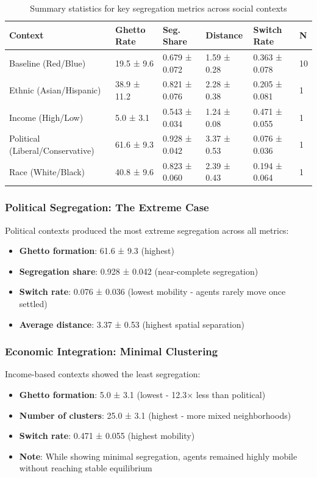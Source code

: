 \documentclass[pdflatex,sn-basic]{sn-jnl}%
\begin{document}
\begin{table}[h]
\caption{Summary statistics for key segregation metrics across social contexts}
\centering
\begin{tabular}{llllll}
\hline
Context & Ghetto Rate & Seg. Share & Distance & Switch Rate & N\\
\hline
Baseline (Red/Blue) & 19.5 ± 9.6 & 0.679 ± 0.072 & 1.59 ± 0.28 & 0.363 ± 0.078 & 10\\
Ethnic (Asian/Hispanic) & 38.9 ± 11.2 & 0.821 ± 0.076 & 2.28 ± 0.38 & 0.205 ± 0.081 & 1\\
Income (High/Low) & 5.0 ± 3.1 & 0.543 ± 0.034 & 1.24 ± 0.08 & 0.471 ± 0.055 & 1\\
Political (Liberal/Conservative) & 61.6 ± 9.3 & 0.928 ± 0.042 & 3.37 ± 0.53 & 0.076 ± 0.036 & 1\\
Race (White/Black) & 40.8 ± 9.6 & 0.823 ± 0.060 & 2.39 ± 0.43 & 0.194 ± 0.064 & 1\\
\hline
\end{tabular}
\end{table}

\subsubsection{Political Segregation: The Extreme
Case}\label{political-segregation-the-extreme-case}

Political contexts produced the most extreme segregation across all
metrics: 
\begin{itemize}
\item \textbf{Ghetto formation}: 61.6 ± 9.3 (highest) 
\item \textbf{Segregation share}: 0.928 ± 0.042 (near-complete segregation) 
\item \textbf{Switch rate}: 0.076 ± 0.036 (lowest mobility - agents rarely
move once settled) 
\item \textbf{Average distance}: 3.37 ± 0.53 (highest
spatial separation)
\end{itemize}

\subsubsection{Economic Integration: Minimal
Clustering}\label{economic-integration-minimal-clustering}

Income-based contexts showed the least segregation: 
\begin{itemize}
\item \textbf{Ghetto
formation}: 5.0 ± 3.1 (lowest - 12.3× less than political) 
\item \textbf{Number of clusters}: 25.0 ± 3.1 (highest - more mixed
neighborhoods) 
\item \textbf{Switch rate}: 0.471 ± 0.055 (highest mobility)
\item \textbf{Note}: While showing minimal segregation, agents remained
highly mobile without reaching stable equilibrium
\end{itemize}
\end{document}
